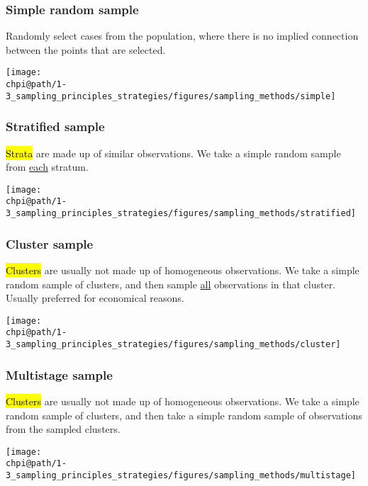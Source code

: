 \documentclass[slidestop,compress,mathserif]{beamer}
\makeatletter
\def\chpi@path{../../Chp 1}  %
\makeatother
\begin{document}

\begin{frame}
	\frametitle{Simple random sample}

	Randomly select cases from the population, where there is no implied connection between the points that are selected.

	\begin{center}
	\texttt{[image: \\chpi@path/1-3\_sampling\_principles\_strategies/figures/sampling\_methods/simple]}
	\end{center}

\end{frame}


\begin{frame}
	\frametitle{Stratified sample}

	\hl{Strata} are made up of similar observations. We take a simple random sample from \underline{each} stratum.

	\begin{center}
	\texttt{[image: \\chpi@path/1-3\_sampling\_principles\_strategies/figures/sampling\_methods/stratified]}
	\end{center}

\end{frame}


\begin{frame}
	\frametitle{Cluster sample}

	\hl{Clusters} are usually not made up of homogeneous observations. We take a simple random sample of clusters, and then sample \underline{all} observations in that cluster. Usually preferred for economical reasons.

	\begin{center}
	\texttt{[image: \\chpi@path/1-3\_sampling\_principles\_strategies/figures/sampling\_methods/cluster]}
	\end{center}

\end{frame}


\begin{frame}
	\frametitle{Multistage sample}

	\hl{Clusters} are usually not made up of homogeneous observations.  We take a simple random sample of clusters, and then take a simple random sample of observations from the sampled clusters.

	\begin{center}
	\texttt{[image: \\chpi@path/1-3\_sampling\_principles\_strategies/figures/sampling\_methods/multistage]}
	\end{center}

\end{frame}
\end{document}
